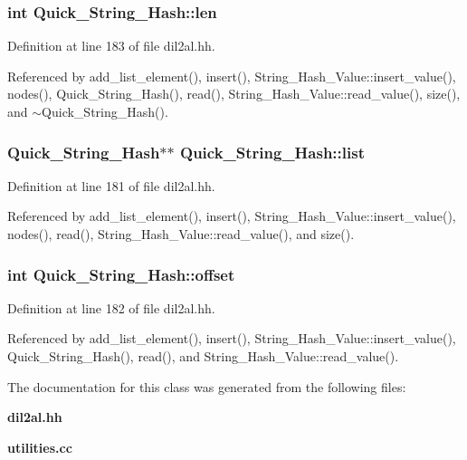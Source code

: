 \subsubsection{\setlength{\rightskip}{0pt plus 5cm}int Quick\_\-String\_\-Hash::len\hspace{0.3cm}{\tt  [protected]}}\label{classQuick__String__Hash_n2}




Definition at line 183 of file dil2al.hh.

Referenced by add\_\-list\_\-element(), insert(), String\_\-Hash\_\-Value::insert\_\-value(), nodes(), Quick\_\-String\_\-Hash(), read(), String\_\-Hash\_\-Value::read\_\-value(), size(), and $\sim$Quick\_\-String\_\-Hash().
\subsubsection{\setlength{\rightskip}{0pt plus 5cm}Quick\_\-String\_\-Hash$\ast$$\ast$ Quick\_\-String\_\-Hash::list\hspace{0.3cm}{\tt  [protected]}}\label{classQuick__String__Hash_n0}




Definition at line 181 of file dil2al.hh.

Referenced by add\_\-list\_\-element(), insert(), String\_\-Hash\_\-Value::insert\_\-value(), nodes(), read(), String\_\-Hash\_\-Value::read\_\-value(), and size().
\subsubsection{\setlength{\rightskip}{0pt plus 5cm}int Quick\_\-String\_\-Hash::offset\hspace{0.3cm}{\tt  [protected]}}\label{classQuick__String__Hash_n1}




Definition at line 182 of file dil2al.hh.

Referenced by add\_\-list\_\-element(), insert(), String\_\-Hash\_\-Value::insert\_\-value(), Quick\_\-String\_\-Hash(), read(), and String\_\-Hash\_\-Value::read\_\-value().

The documentation for this class was generated from the following files:\begin{CompactItemize}
\item 
{\bf dil2al.hh}\item 
{\bf utilities.cc}\end{CompactItemize}
